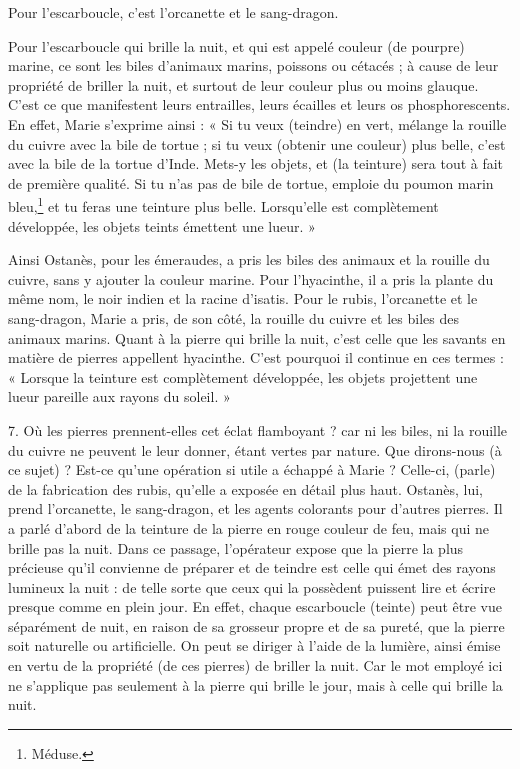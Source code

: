 \documentclass[a4paper, 11pt, oneside, polutonikogreek, french]{article}
\begin{document}
Pour l'escarboucle, c'est l'orcanette et le sang-dragon.

Pour l'escarboucle qui brille la nuit, et qui est appelé couleur (de pourpre) marine, ce sont les biles d'animaux marins, poissons ou cétacés ; à cause de leur propriété de briller la nuit, et surtout de leur couleur plus ou moins glauque. C'est ce que manifestent leurs entrailles, leurs écailles et leurs os phosphorescents. En effet, Marie s'exprime ainsi : « Si tu veux (teindre) en vert, mélange la rouille du cuivre avec la bile de tortue ; si tu veux (obtenir une couleur) plus belle, c'est avec la bile de la tortue d'Inde. Mets-y les objets, et (la teinture) sera tout à fait de première qualité. Si tu n'as pas de bile de tortue, emploie du poumon marin bleu,\footnote{Méduse.} et tu feras une teinture plus belle. Lorsqu'elle est complètement développée, les objets teints émettent une lueur. »

Ainsi Ostanès, pour les émeraudes, a pris les biles des animaux et la rouille du cuivre, sans y ajouter la couleur marine. Pour l'hyacinthe, il a pris la plante du même nom, le noir indien et la racine d'isatis. Pour le rubis, l'orcanette et le sang-dragon, Marie a pris, de son côté, la rouille du cuivre et les biles des animaux marins. Quant à la pierre qui brille la nuit, c'est celle que les savants en matière de pierres appellent hyacinthe. C'est pourquoi il continue en ces termes : « Lorsque la teinture est complètement développée, les objets projettent une lueur pareille aux rayons du soleil. »

7. Où les pierres prennent-elles cet éclat flamboyant ? car ni les biles, ni la rouille du cuivre ne peuvent le leur donner, étant vertes par nature. Que dirons-nous (à ce sujet) ? Est-ce qu'une opération si utile a échappé à Marie ? Celle-ci, (parle) de la fabrication des rubis, qu'elle a exposée en détail plus haut. Ostanès, lui, prend l'orcanette, le sang-dragon, et les agents colorants pour d'autres pierres. Il a parlé d'abord de la teinture de la pierre en rouge couleur de feu, mais qui ne brille pas la nuit. Dans ce passage, l'opérateur expose que la pierre la plus précieuse qu'il convienne de préparer et de teindre est celle qui émet des rayons lumineux la nuit : de telle sorte que ceux qui la possèdent puissent lire et écrire presque comme en plein jour. En effet, chaque escarboucle (teinte) peut être vue séparément de nuit, en raison de sa grosseur propre et de sa pureté, que la pierre soit naturelle ou artificielle. On peut se diriger à l'aide de la lumière, ainsi émise en vertu de la propriété (de ces pierres) de briller la nuit. Car le mot employé ici ne s'applique pas seulement à la pierre qui brille le jour, mais à celle qui brille la nuit.
\end{document}
